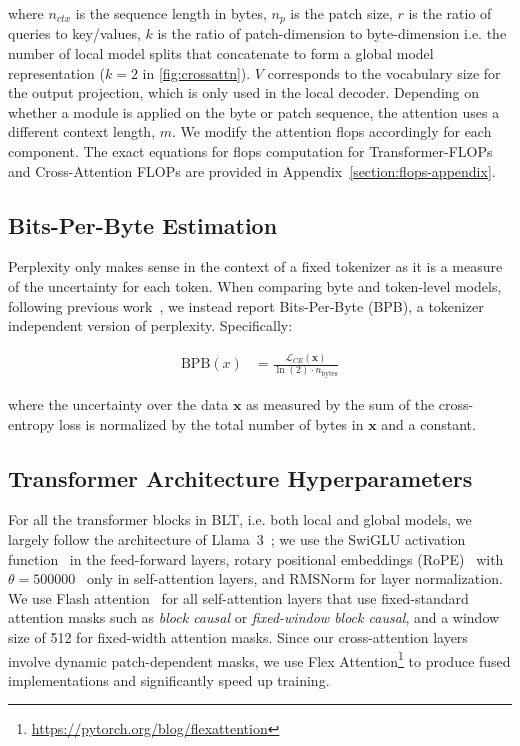 where $n_{ctx}$ is the sequence length in bytes, $n_p$ is the patch size, $r$ is the ratio of queries to key/values, $k$ is the ratio of patch-dimension to byte-dimension i.e. the number of local model splits that concatenate to form a global model representation ($k=2$ in \autoref{fig:crossattn}). $V$ corresponds to the vocabulary size for the output projection, which is only used in the local decoder. Depending on whether a module is applied on the byte or patch sequence, the attention uses a different context length, $m$. We modify the attention flops accordingly for each component. The exact equations for flops computation for Transformer-FLOPs and Cross-Attention FLOPs are provided in Appendix~\ref{section:flops-appendix}.

\subsection{Bits-Per-Byte Estimation} Perplexity only makes sense in the context of a fixed tokenizer as it is a measure of the uncertainty for each token. When comparing byte and token-level models, following previous work~\citep{xue2022byt5, yu2023megabyte, wang2024mambabyte}, we instead report Bits-Per-Byte (BPB), a tokenizer independent version of perplexity. Specifically:

\begin{align}
    \text{BPB}(x)&= \frac{\mathcal{L}_{CE}(\pmb{x})}{\ln(2)\cdot n_{\text{bytes}}}
\end{align}

where the uncertainty over the data $\pmb{x}$ as measured by the sum of the cross-entropy loss is normalized by the total number of bytes in $\pmb{x}$ and a constant. 

\subsection{Transformer Architecture Hyperparameters} For all the transformer blocks in {\textsc BLT}, i.e. both local and global models, we largely follow the architecture of Llama~3~\citep{dubey2024llama}; we use the SwiGLU activation function~\citep{swiglu} in the feed-forward layers, rotary positional embeddings (RoPE)~\citep{RoPe} with $\theta=500000$~\citep{xiong2024effective} only in self-attention layers, and RMSNorm \citep{RMSNorm} for layer normalization. We use Flash attention~\citep{dao2022flashattention} for all self-attention layers that use fixed-standard attention masks such as \textit{block causal} or \textit{fixed-window block causal}, and a window size of 512 for fixed-width attention masks. Since our cross-attention layers involve dynamic patch-dependent masks, we use Flex Attention\footnote{\url{https://pytorch.org/blog/flexattention}} to produce fused implementations and significantly speed up training.

